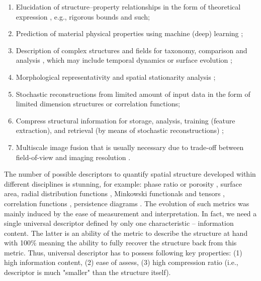 \documentclass[reprint,amsmath,amssymb,aps,pre,showkeys,showpacs]{revtex4-1}
\begin{document}
\begin{enumerate}
  \item Elucidation of structure--property relationships in the form of
    theoretical expression \cite{Torquato_book,Sahimi_book}, e.g., rigorous
    bounds and such;
  \item Prediction of material physical properties using machine (deep) learning
    \cite{obayashi2018persistence,kamrava2020linking,roding2020predicting};
  \item Description of complex structures and fields for taxonomy, comparison
    and analysis
    \cite{takada2003three,hopkins2013stars,shivashankar2015felix,saadatfar2017pore,
      portillo2018developing,KarsaninaEJSS,PNM_Morse,khlyupin2023molecular},
    which may include temporal dynamics or surface evolution
    \cite{jiao2013,PhysRevE.92.023301,prokhorov2022,chen2022,fomin2023soil};
  \item Morphological representativity
    \cite{capek2009,rozenbaum2014,gerke2019tensor} and spatial stationarity
    analysis \cite{REVpaper,LavrukhinPRE};
  \item Stochastic reconstructions from limited amount of input data
    \cite{Adler_recon,Y-T,tahmasebiPRL,Euras2012,EPL2,karsaninaPRL,rozanski2023}
    in the form of limited dimension structures or correlation functions;
  \item Compress structural information for storage, analysis, training (feature
    extraction), and retrieval (by means of stochastic reconstructions)
    \cite{jiao2007,SciRep1,Havelka,KarsaninaEJSS};
  \item Multiscale image fusion that is usually necessary due to trade-off
    between field-of-view and imaging resolution
    \cite{SciRep1,Geoderma2018,chen2020super,karimpouli2022}.
\end{enumerate}

The number of possible descriptors to quantify spatial structure developed
within different disciplines is stunning, for example: phase ratio or porosity
\cite{anovitz2015characterization}, surface area, radial distribution functions
\cite{zimm1948scattering,becker2010radial}, Minkowski functionals
\cite{vogel2010} and tensors \cite{schroder2011minkowski}, correlation functions
\cite{Torquato_book}, persistence diagrams
\cite{shivashankar2015felix,saadatfar2017pore,obayashi2018persistence}. The
evolution of such metrics was mainly induced by the ease of measurement and
interpretation. In fact, we need a single universal descriptor defined by only
one characteristic -- information content. The latter is an ability of the
metric to describe the structure at hand with 100\% meaning the ability to
fully recover the structure back from this metric. Thus, universal descriptor
has to possess following key properties: (1) high information content, (2) ease
of assess, (3) high compression ratio (i.e., descriptor is much "smaller" than
the structure itself).
\end{document}
